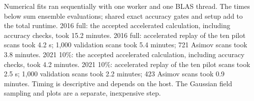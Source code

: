 Numerical fits ran sequentially with one worker and one BLAS thread. The times below sum ensemble evaluations; shared exact accuracy gates and setup add to the total runtime. 2016 full: the accepted accelerated calculation, including accuracy checks, took 15.2 minutes. 2016 full: accelerated replay of the ten pilot scans took 4.2 s; 1,000 validation scans took 5.4 minutes; 721 Asimov scans took 3.8 minutes. 2021 10\%: the accepted accelerated calculation, including accuracy checks, took 4.2 minutes. 2021 10\%: accelerated replay of the ten pilot scans took 2.5 s; 1,000 validation scans took 2.2 minutes; 423 Asimov scans took 0.9 minutes. Timing is descriptive and depends on the host. The Gaussian field sampling and plots are a separate, inexpensive step.
